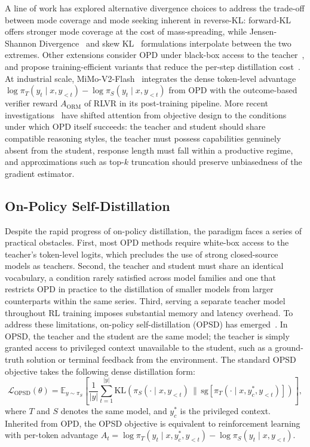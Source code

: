 A line of work has explored alternative divergence choices to address the trade-off between mode coverage and mode seeking inherent in reverse-KL: forward-KL offers stronger mode coverage at the cost of mass-spreading, while Jensen-Shannon Divergence~\citep{agarwal2024policy} and skew KL~\citep{ko2024distillm} formulations interpolate between the two extremes. Other extensions consider OPD under black-box access to the teacher~\citep{ye2025black}, and propose training-efficient variants that reduce the per-step distillation cost~\citep{wu2026lightning}. At industrial scale, MiMo-V2-Flash~\citep{xiao2026mimo} integrates the dense token-level advantage $\log \pi_T(y_t\mid x,y_{<t}) - \log \pi_S(y_t\mid x,y_{<t})$ from OPD with the outcome-based verifier reward $A_\mathrm{ORM}$ of RLVR in its post-training pipeline. More recent investigations~\citep{li2026rethinking,fu2026revisiting,zhu2026many} have shifted attention from objective design to the conditions under which OPD itself succeeds: the teacher and student should share compatible reasoning styles, the teacher must possess capabilities genuinely absent from the student, response length must fall within a productive regime, and approximations such as top-$k$ truncation should preserve unbiasedness of the gradient estimator.

\subsection{On-Policy Self-Distillation}
Despite the rapid progress of on-policy distillation, the paradigm faces a series of practical obstacles. First, most OPD methods require white-box access to the teacher's token-level logits, which precludes the use of strong closed-source models as teachers. Second, the teacher and student must share an identical vocabulary, a condition rarely satisfied across model families and one that restricts OPD in practice to the distillation of smaller models from larger counterparts within the same series. Third, serving a separate teacher model throughout RL training imposes substantial memory and latency overhead. To address these limitations, on-policy self-distillation (OPSD) has emerged~\citep{zhao2026self,han2026adaptive,yu2026preference,hao2026self,heakl2026cepo}. In OPSD, the teacher and the student are the same model; the teacher is simply granted access to privileged context unavailable to the student, such as a ground-truth solution or terminal feedback from the environment. The standard OPSD objective takes the following dense distillation form:
\begin{equation}
\mathcal{L}_{\text{OPSD}}(\theta) = \mathbb{E}_{y \sim \pi_S} \left[ \frac{1}{|y|} \sum_{t=1}^{|y|} \mathrm{KL}\left( \pi_S(\cdot \mid x, y_{<t}) \,\|\, \mathrm{sg}[\pi_T(\cdot \mid x, y_c^*, y_{<t})] \right) \right],
\end{equation}
where $T$ and $S$ denotes the same model, and $y_c^*$ is the privileged context. Inherited from OPD, the OPSD objective is equivalent to reinforcement learning with per-token advantage $A_{t} = \log \pi_T(y_t \mid x, y_c^*, y_{<t}) - \log \pi_S(y_t \mid x, y_{<t})$. 

